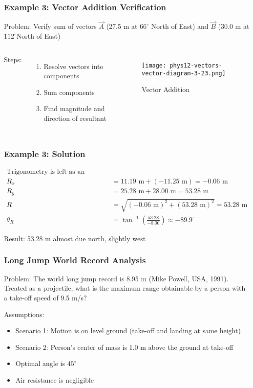 \documentclass{beamer}
\begin{document}
\begin{frame}
\frametitle{Example 3: Vector Addition Verification}
Problem: Verify sum of vectors $\vec{A}$ (27.5 m at $66^\circ$ North of East) and $\vec{B}$ (30.0 m at $112^\circ$North of East)

\begin{columns}
Steps:
\begin{enumerate}
\item Resolve vectors into components
\item Sum components
\item Find magnitude and direction of resultant
\end{enumerate}

\begin{figure}
\centering
\texttt{[image: phys12-vectors-vector-diagram-3-23.png]}
\caption{Vector Addition}
\end{figure}
\end{columns}
\end{frame}

\begin{frame}
\frametitle{Example 3: Solution}
\begin{align*}
\text {Trigonometry is left as an exercise.} \\
R_x &= 11.19 \text{ m} + (-11.25 \text{ m}) = -0.06 \text{ m} \\
R_y &= 25.28 \text{ m} + 28.00 \text{ m} = 53.28 \text{ m} \\
R &= \sqrt{(-0.06 \text{ m})^2 + (53.28 \text{ m})^2} = 53.28 \text{ m} \\
\theta_R &= \tan^{-1} \left( \frac{53.28}{-0.06} \right) \approx -89.9^\circ
\end{align*}

Result: 53.28 m almost due north, slightly west
\end{frame}

\begin{frame}
\frametitle{Long Jump World Record Analysis}
Problem: The world long jump record is 8.95 m (Mike Powell, USA, 1991). Treated as a projectile, what is the maximum range obtainable by a person with a take-off speed of 9.5 m/s?

Assumptions:
\begin{itemize}
\item Scenario 1: Motion is on level ground (take-off and landing at same height)
\item Scenario 2: Person's center of mass is 1.0 m above the ground at take-off
\item Optimal angle is $45^\circ$
\item Air resistance is negligible
\end{itemize}
\end{frame}
\end{document}
